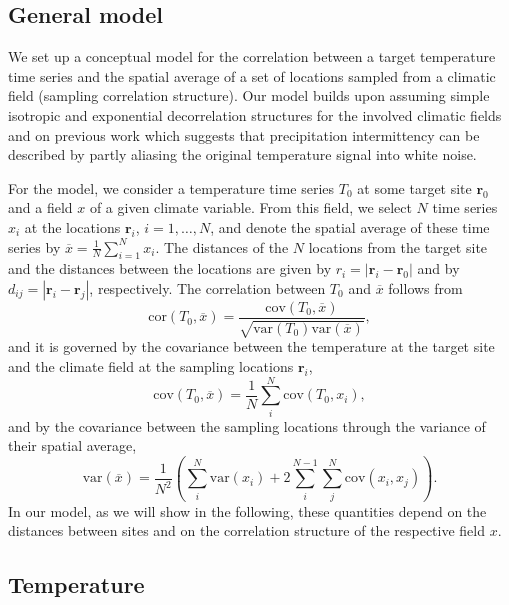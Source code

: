\documentclass[cp, manuscript, draft]{copernicus}
\begin{document}
\subsection{General model}
\label{app:concept.model.general}

We set up a conceptual model for the correlation between a target temperature
time series and the spatial average of a set of locations sampled from a
climatic field (sampling correlation structure). Our model builds upon assuming
simple isotropic and exponential decorrelation structures for the involved
climatic fields and on previous work which suggests that precipitation
intermittency can be described by partly aliasing the original temperature
signal into white noise.

For the model, we consider a temperature time series $T_0$ at some target site
$\mathbf{r}_0$ and a field $x$ of a given climate variable. From this field, we
select $N$ time series $x_i$ at the locations $\mathbf{r}_i$, $i=1,\dotsc,N$,
and denote the spatial average of these time series by
$\overline{x}=\frac{1}{N}\sum_{i=1}^{N}{x_i}$. The distances of the $N$
locations from the target site and the distances between the locations are given
by $r_i=|\mathbf{r}_i-\mathbf{r}_0|$ and by
$d_{ij}=|{\mathbf{r}_i-\mathbf{r}_j}|$, respectively. The correlation between
$T_0$ and $\overline{x}$ follows from
%
\begin{equation}
\label{eq:corr.general}
\mathrm{cor}(T_0,\overline{x})=\frac
{\mathrm{cov}(T_0,\overline{x})}
{\sqrt{\mathrm{var}(T_0)\mathrm{var}(\overline{x})}},
\end{equation}
and it is governed by the covariance between the temperature at the target site
and the climate field at the sampling locations $\mathbf{r}_i$,
%
\begin{equation}
\label{eq:cov.general}
\mathrm{cov}(T_0,\overline{x})=
\frac{1}{N}\sum_{i}^{N}{\mathrm{cov}(T_0,x_i)},
\end{equation}
%
and by the covariance between the sampling locations through the variance of
their spatial average,
\begin{equation}
\label{eq:var.general}
\mathrm{var}(\overline{x})=
\frac{1}{N^2}\left(
\sum_{i}^{N}{\mathrm{var}(x_i)} +
2\sum_{i}^{N-1}\sum_{j}^{N}{\mathrm{cov}(x_i,x_j)}
\right).
\end{equation}
%
In our model, as we will show in the following, these quantities depend on the
distances between sites and on the correlation structure of the respective field
$x$.

\subsection{Temperature}
\label{app:concept.model.t2m}
\end{document}

